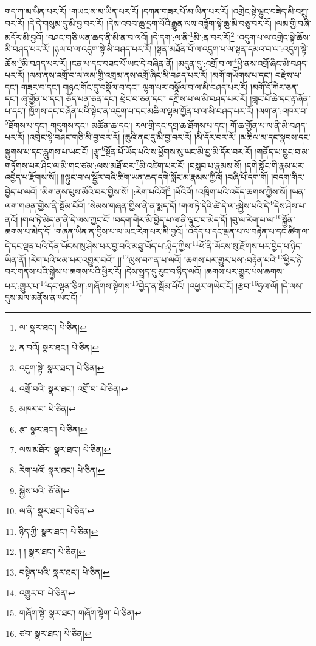 གད་ཀ་མ་ཡིན་པར་རོ། །གཡང་ས་མ་ཡིན་པར་རོ། །དཀན་གཟར་པོ་མ་ཡིན་པར་རོ། །འགྲེང་སྟེ་ལྷུང་བཟེད་མི་བཀྲུ་བར་རོ། །དེ་དེ་གསུམ་དུ་མི་བྱ་བར་རོ། །དེས་འབབ་ཆུ་དྲག་པོའི་རྒྱུན་ལས་བཟློག་སྟེ་ཆུ་མི་བཅུ་བར་རོ། །ལམ་གྱི་བཞི་མདོར་མི་བྱའོ། །བཤང་གཅི་ཡན་ཆད་ནི་མི་ན་བ་ལའོ། །དེ་དག་:ལ་ནི་\footnote{ལ་  སྣར་ཐང་།  པེ་ཅིན། }མི་:ན་བར་རོ།\footnote{ན་བའོ།  སྣར་ཐང་།  པེ་ཅིན། } །འདུག་པ་ལ་འགྲེང་སྟེ་ཆོས་མི་བཤད་པར་རོ། །ཉལ་བ་ལ་འདུག་སྟེ་མི་བཤད་པར་རོ། །སྟན་མཐོན་པོ་ལ་འདུག་པ་ལ་སྟན་དམའ་བ་ལ་:འདུག་སྟེ་ཆོས་\footnote{འདུག་སྟེ་  སྣར་ཐང་།  པེ་ཅིན། }མི་བཤད་པར་རོ། །ངན་པ་དང་བཟང་པོ་ཡང་དེ་བཞིན་ནོ། །མདུན་དུ་:འགྲོ་བ་ལ་\footnote{འགྲོ་བའི་  སྣར་ཐང་། འགྲོ་བ་  པེ་ཅིན། }ཕྱི་ནས་འགྲོ་ཞིང་མི་བཤད་པར་རོ། །ལམ་ནས་འགྲོ་བ་ལ་ལམ་གྱི་འགྲམ་ནས་འགྲོ་ཞིང་མི་བཤད་པར་རོ། །མགོ་གཡོགས་པ་དང་། བརྫེས་པ་དང་། གཟར་བ་དང་། གཉའ་གོང་དུ་བསྣོལ་བ་དང་། ལྷག་པར་བསྣོལ་བ་ལ་མི་བཤད་པར་རོ། །མགོ་དོ་ཀེར་ཅན་དང་། ཞྭ་གྱོན་པ་དང་། ཅོད་པན་ཅན་དང་། ཕྲེང་བ་ཅན་དང་། དཀྲིས་པ་ལ་མི་བཤད་པར་རོ། །གླང་པོ་ཆེ་དང་རྟ་ཞོན་པ་དང་། ཁྱོགས་དང་བཞོན་པའི་སྟེང་ན་འདུག་པ་དང་མཆིལ་ལྷམ་གྱོན་པ་ལ་མི་བཤད་པར་རོ། །ལག་ན་:འཁར་བ་\footnote{མཁར་བ་  པེ་ཅིན། }ཐོགས་པ་དང་། གདུགས་དང་། མཚོན་ཆ་དང་། རལ་གྲི་དང་དགྲ་ཆ་ཐོགས་པ་དང་། གོ་ཆ་གྱོན་པ་ལ་ནི་མི་བཤད་པར་རོ། །འགྲེང་སྟེ་བཤང་གཅི་མི་བྱ་བར་རོ། །ཆུའི་ནང་དུ་མི་བྱ་བར་རོ། །མི་དོར་བར་རོ། །མཆིལ་མ་དང་སྣབས་དང་སྐྱུགས་པ་དང་རླུགས་པ་ཡང་ངོ། །རྩྭ་\footnote{རྩ་  སྣར་ཐང་།  པེ་ཅིན། }སྔོན་པོ་ཡོད་པའི་ས་ཕྱོགས་སུ་ཡང་མི་བྱ་མི་དོར་བར་རོ། །གནོད་པ་བྱུང་བ་མ་གཏོགས་པར་ཤིང་ལ་མི་གང་ཙམ་:ལས་མཐོ་བར་\footnote{ལས་མཐོར་  སྣར་ཐང་།  པེ་ཅིན། }མི་འཛེག་པར་རོ། །བསླབ་པ་རྣམས་སོ། །དགེ་སློང་གི་རྣམ་པར་འབྱེད་པ་རྫོགས་སོ།། །།ལྟུང་བ་ལ་སྦྱོར་བའི་ཚིག་ཡན་ཆད་དགེ་སློང་མ་རྣམས་ཀྱིའོ། །བཞི་པོ་དག་གོ། །བདག་གིར་བྱེད་པ་ལའོ། །མིག་ནས་པུས་མོའི་བར་གྱིས་སོ། །:རེག་པའིའོ།\footnote{རེག་པའོ།  སྣར་ཐང་།  པེ་ཅིན། } །ཕོའིའོ། །འཁྲིག་པའི་འདོད་ཆགས་ཀྱིས་སོ། །ཡན་ལག་གཞན་གྱིས་ནི་སྦོམ་པོའོ། །སེམས་གཞན་གྱིས་ནི་ན་སྨད་དོ། །གལ་ཏེ་དེའི་ཚེ་དེ་ལ་:སྐྱེས་པའི་དེ་\footnote{སྐྱེས་པའི་  ཅོ་ནེ། }དེས་ཤེས་པ་ནའོ། །གལ་ཏེ་མེད་ན་ནི་དེ་ལས་ཀྱང་ངོ། །བདག་གིར་མི་བྱེད་པ་ལ་ནི་ལྟུང་བ་མེད་དོ། །བུ་ལ་རེག་པ་ལ་\footnote{ལ་ནི་  སྣར་ཐང་།  པེ་ཅིན། }སྐྱོན་ཆགས་པ་མེད་དོ། །གཞན་ཡིན་ན་བྱིས་པ་ལ་ཡང་རེག་པར་མི་བྱའོ། །འདོད་པ་དང་ལྡན་པ་ལ་བརྟེན་པ་དང་ཚིག་ལ་དེ་དང་ལྡན་པའི་དོན་ཡོངས་སུ་ཤེས་པར་བྱ་བའི་མཐུ་ཡོད་པ་:ཉིད་ཀྱིས་\footnote{ཉིད་ཀྱི་  སྣར་ཐང་།  པེ་ཅིན། }ཕོ་ནི་ཡོངས་སུ་རྫོགས་པར་བྱེད་པ་ཉིད་ཡིན་ནོ། །རེག་པའི་ཕམ་པར་འགྱུར་བའོ།། །།\footnote{། །  སྣར་ཐང་།  པེ་ཅིན། }ལུས་བཀན་པ་ལའོ། །ཆགས་པར་གྱུར་པས་:བརྟེན་པའི་\footnote{བསྟེན་པའི་  སྣར་ཐང་།  པེ་ཅིན། }ཕྱིར་ཉེ་བར་གནས་པའི་སྐྱེས་པ་ཆགས་པའི་ཕྱིར་རོ། །དེས་སྤྲད་དུ་རུང་བ་ཉིད་ལའོ། །ཆགས་པར་གྱུར་པས་ཆགས་པར་:གྱུར་པ་\footnote{འགྱུར་བ་  པེ་ཅིན། }དང་ལྷན་ཅིག་:གཞོགས་སྟེགས་\footnote{གཞོག་སྟེ་  སྣར་ཐང་། གཞོག་སྟེག་  པེ་ཅིན། }བྱེད་ན་སྦོམ་པོའོ། །འཕྱར་གཡེང་ངོ། །རྩབ་\footnote{ཙབ་  སྣར་ཐང་།  པེ་ཅིན། }ཧྲལ་ལོ། །དེ་ལས་དུས་མལ་མནོས་ན་ཡང་ངོ། །

